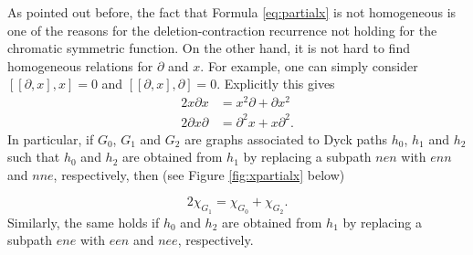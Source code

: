 \documentclass[10pt]{amsart}
\theoremstyle{definition}
\begin{document}
  As pointed out before, the fact that Formula \eqref{eq:partialx} is not homogeneous is one of the reasons for the deletion-contraction recurrence not holding for the chromatic symmetric function. On the other hand, it is not hard to find homogeneous relations for $\partial$ and $x$. For example, one can simply consider $[[\partial,x],x]=0$ and $[[\partial,x],\partial]=0$. Explicitly this gives
   \begin{equation}
   \label{eq:basicpartial}
       \begin{aligned}
       2x\partial x&=x^2\partial+\partial x^2\\
       2\partial x\partial&=\partial^2x+x\partial^2.
       \end{aligned}
    \end{equation}
    In particular, if $G_0$, $G_1$ and $G_2$ are graphs associated to Dyck paths $h_0$, $h_1$ and $h_2$ such that $h_0$ and $h_2$ are obtained from $h_1$ by replacing a subpath $nen$ with $enn$ and $nne$,  respectively, then (see Figure \ref{fig:xpartialx} below)\par
    \begin{equation}
    \label{eq:basicpol}
        2\chi_{G_1}=\chi_{G_0}+\chi_{G_2}.
    \end{equation}
    Similarly, the same holds if $h_0$ and $h_2$ are obtained from $h_1$ by replacing a subpath $ene$ with $een$ and $nee$, respectively.

\end{document}
